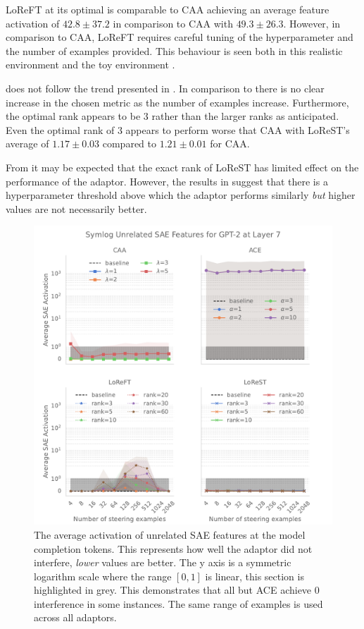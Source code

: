 LoReFT at its optimal is comparable to CAA achieving an average feature activation of $42.8 \pm 37.2$ in comparison to CAA with $49.3 \pm 26.3$.
However, in comparison to CAA, LoReFT requires careful tuning of the hyperparameter and the number of examples provided.
This behaviour is seen both in this realistic environment and the toy environment .

 does not follow the trend presented in \citet{steering-clear}.
In comparison to  there is no clear increase in the chosen metric as the number of examples increase.
Furthermore, the optimal rank appears to be $3$ rather than the larger ranks as anticipated.
Even the optimal rank of $3$ appears to perform worse that CAA with LoReST's average of $1.17 \pm 0.03$ compared to $1.21 \pm 0.01$ for CAA.

From  it may be expected that the exact rank of LoReST has limited effect on the performance of the adaptor.
However, the results in  suggest that there is a hyperparameter threshold above which the adaptor performs similarly \emph{but} higher values are not necessarily better.

\begin{figure}
    \centering
    \captionsetup{width=\textwidth}
    \includegraphics[width=\textwidth]{figures/gpt2_7_unrelated.pdf}
    \caption{
        The average activation of unrelated SAE features at the model completion tokens.
        This represents how well the adaptor did not interfere, \emph{lower} values are better.
        The y axis is a symmetric logarithm scale where the range $[0,1]$ is linear, this section is highlighted in grey.
        This demonstrates that all but ACE achieve 0 interference in some instances.
        The same range of examples is used across all adaptors.
    }
    \label{fig:gpt-pp-unrelated}
\end{figure}

